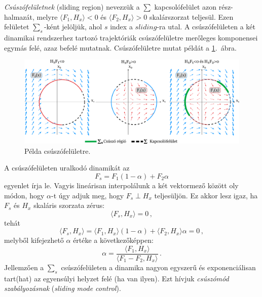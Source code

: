 \emph{Csúszófelületnek} (sliding region) nevezzük a $\sum$ kapcsolófelület azon rész-
halmazát, melyre $\langle F_1, H_x \rangle<0$ és $\langle F_2, H_x \rangle> 0$ skalárszorzat teljesül. Ezen felületet $\sum_s$-ként jelöljük, ahol $s$ index a $sliding$-ra utal. A csúszófelületen a két dinamikai rendszerhez tartozó trajektóriák csúszófelületre merőleges komponensei egymás felé, azaz befelé mutatnak. Csúszófelületre mutat példát a \ref{fig:csuszofelulet}.~ábra.

\begin{figure}[!h]
\centering
\includegraphics[width=\textwidth]{graphics/sliding_region_fancy.png}
\caption{Példa csúszófelületre.}
\label{fig:csuszofelulet}
\end{figure}

A csúszófelületen uralkodó dinamikát az
%
\begin{equation}
F_s=F_1(1-\alpha)+F_2\alpha 
\end{equation}
%
\noindent egyenlet írja le. Vagyis lineárisan interpolálunk a két vektormező között oly módon, hogy $\alpha$-t úgy adjuk meg, hogy $F_s\perp H_x$ teljesüljön. Ez akkor lesz igaz, ha $F_s$ és $H_x$ skaláris szorzata zérus:
%
\begin{equation}
\langle F_s, H_x \rangle =0 \,,
\end{equation}
%
\noindent tehát
%
\begin{equation}
\langle F_s, H_x \rangle = \langle F_1, H_x \rangle (1-\alpha) + \langle F_2, H_x \rangle \alpha = 0\,,
\end{equation}
%
\noindent melyből kifejezhető $\alpha$ értéke a következőképpen:
%
\begin{equation}
\alpha=\frac{\langle F_1, H_x \rangle}{\langle F_1-F_2, H_x \rangle}\,. 
\end{equation}
%
Jellemzően a $\sum _s$ csúszófelületen a dinamika nagyon egyszerű és exponenciálisan tart(hat) az egyensúlyi helyzet felé (ha van ilyen). Ezt hívjuk \emph{csúszómód szabályozásnak} (\textit{sliding mode control}).

